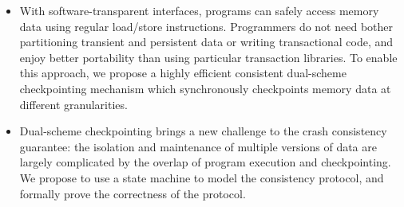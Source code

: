\begin{eabstract}
\begin{itemize}
\item With software-transparent interfaces, programs can safely access memory data using regular load/store instructions. Programmers do not need bother partitioning transient and persistent data or writing transactional code, and enjoy better portability than using particular transaction libraries. To enable this approach, we propose a highly efficient consistent dual-scheme checkpointing mechanism which synchronously checkpoints memory data at different granularities.

\item Dual-scheme checkpointing brings a new challenge to the crash consistency guarantee: the isolation and maintenance of multiple versions of data are largely complicated by the overlap of program execution and checkpointing. We propose to use a state machine to model the consistency protocol, and formally prove the correctness of the protocol.

\end{itemize}

\end{eabstract}


